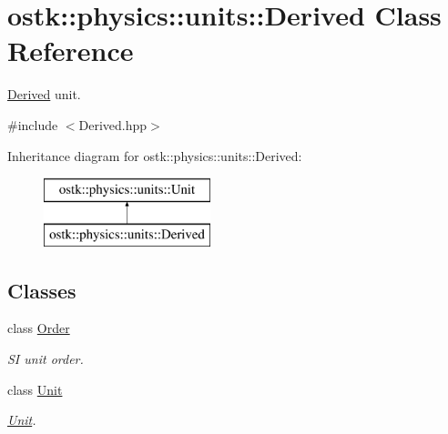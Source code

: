 \hypertarget{classostk_1_1physics_1_1units_1_1_derived}{}\section{ostk\+:\+:physics\+:\+:units\+:\+:Derived Class Reference}
\label{classostk_1_1physics_1_1units_1_1_derived}


\hyperlink{classostk_1_1physics_1_1units_1_1_derived}{Derived} unit.  




{\ttfamily \#include $<$Derived.\+hpp$>$}

Inheritance diagram for ostk\+:\+:physics\+:\+:units\+:\+:Derived\+:\begin{figure}[H]
\begin{center}
\leavevmode
\includegraphics[height=2.000000cm]{classostk_1_1physics_1_1units_1_1_derived}
\end{center}
\end{figure}
\subsection*{Classes}
\begin{DoxyCompactItemize}
\item 
class \hyperlink{classostk_1_1physics_1_1units_1_1_derived_1_1_order}{Order}
\begin{DoxyCompactList}\small\item\em SI unit order. \end{DoxyCompactList}\item 
class \hyperlink{classostk_1_1physics_1_1units_1_1_derived_1_1_unit}{Unit}
\begin{DoxyCompactList}\small\item\em \hyperlink{classostk_1_1physics_1_1units_1_1_derived_1_1_unit}{Unit}. \end{DoxyCompactList}\end{DoxyCompactItemize}
